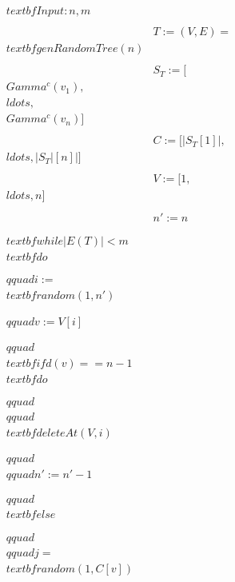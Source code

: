 \documentclass[
]{article}
\begin{document}
\[
\begin{align*}
    &\\textbf{Input: } n, m\\\\
    &T := (V, E) = \\textbf{genRandomTree}(n)\\\\
    &S_T := [\\Gamma^c(v_1), \\ldots, \\Gamma^c(v_n)]  \\\\
    &C := [ |S_T[1]|, \\ldots, |S_T|[n]|]  \\\\
    &V := [1, \\ldots, n]   \\\\
    &n' := n\\\\
    &\\textbf{while } |E(T)| < m \\textbf{ do } \\\\ 
    &\\qquad i := \\textbf{random}(1, n') \\\\ 
    &\\qquad v := V[i]\\\\
    &\\qquad \\textbf{if }  d(v) == n - 1  \\textbf{ do } \\\\ 
    &\\qquad \\qquad \\textbf{deleteAt}(V, i)\\\\ 
    &\\qquad\\qquad n' := n' - 1 \\\\ 
    &\\qquad\\textbf{else } \\\\ 
    &\\qquad\\qquad j = \\textbf{random}(1, C[v])\\\\

\end{align*}\]
\end{document}
